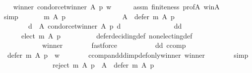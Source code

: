 \begin{isabellebody}
\ \ \isamarkupfalse%
\ winner{\isacharcolon}{\kern0pt}\ {\isachardoublequoteopen}condorcet{\isacharunderscore}{\kern0pt}winner\ A\ p\ w{\isachardoublequoteclose}\isanewline
\ \ \ \ \isamarkupfalse%
\ assm\ finiteness\ prof{\isacharunderscore}{\kern0pt}A\ w{\isacharunderscore}{\kern0pt}in{\isacharunderscore}{\kern0pt}A\isanewline
\ \ \ \ \isamarkupfalse%
\ simp\isanewline
\ \ \isamarkupfalse%
\isanewline
\ \ \ \ {\isachardoublequoteopen}m\ A\ p\ {\isacharequal}{\kern0pt}\isanewline
\ \ \ \ \ \ {\isacharparenleft}{\kern0pt}{\isacharbraceleft}{\kern0pt}{\isacharbraceright}{\kern0pt}{\isacharcomma}{\kern0pt}\isanewline
\ \ \ \ \ \ \ \ A\ {\isacharminus}{\kern0pt}\ defer\ m\ A\ p{\isacharcomma}{\kern0pt}\isanewline
\ \ \ \ \ \ \ \ {\isacharbraceleft}{\kern0pt}d\ {\isasymin}\ A{\isachardot}{\kern0pt}\ condorcet{\isacharunderscore}{\kern0pt}winner\ A\ p\ d{\isacharbraceright}{\kern0pt}{\isacharparenright}{\kern0pt}{\isachardoublequoteclose}\isanewline
\ \ \isamarkupfalse%
\ {\isacharminus}{\kern0pt}\isanewline
\ \ \ \ \isanewline
\ \ \ \ \isamarkupfalse%
\ dd\ \isamarkupfalse%
\ {}{\isacharcolon}{\kern0pt}\isanewline
\ \ \ \ \ \ {\isachardoublequoteopen}elect\ m\ A\ p\ {\isacharequal}{\kern0pt}\ {\isacharbraceleft}{\kern0pt}{\isacharbraceright}{\kern0pt}{\isachardoublequoteclose}\isanewline
\ \ \ \ \ \ \isamarkupfalse%
\ defer{\isacharunderscore}{\kern0pt}deciding{\isacharunderscore}{\kern0pt}def\ non{\isacharunderscore}{\kern0pt}electing{\isacharunderscore}{\kern0pt}def\isanewline
\ \ \ \ \ \ \ \ \ \ \ \ winner\isanewline
\ \ \ \ \ \ \isamarkupfalse%
\ fastforce\isanewline
\ \ \ \ \isanewline
\ \ \ \ \isamarkupfalse%
\ dd\ ccomp\ \isamarkupfalse%
\ {}{\isacharcolon}{\kern0pt}\ {\isachardoublequoteopen}defer\ m\ A\ p\ {\isacharequal}{\kern0pt}\ {\isacharbraceleft}{\kern0pt}w{\isacharbraceright}{\kern0pt}{\isachardoublequoteclose}\isanewline
\ \ \ \ \ \ \isamarkupfalse%
\ ccomp{\isacharunderscore}{\kern0pt}and{\isacharunderscore}{\kern0pt}dd{\isacharunderscore}{\kern0pt}imp{\isacharunderscore}{\kern0pt}def{\isacharunderscore}{\kern0pt}only{\isacharunderscore}{\kern0pt}winner\ winner\isanewline
\ \ \ \ \ \ \isamarkupfalse%
\ simp\isanewline
\ \ \ \ \isanewline
\ \ \ \ \isamarkupfalse%
\ {}\ {}\ \isamarkupfalse%
\ {}{\isacharcolon}{\kern0pt}\ {\isachardoublequoteopen}reject\ m\ A\ p\ {\isacharequal}{\kern0pt}\ A\ {\isacharminus}{\kern0pt}\ defer\ m\ A\ p{\isachardoublequoteclose}\isanewline

\end{isabellebody}
